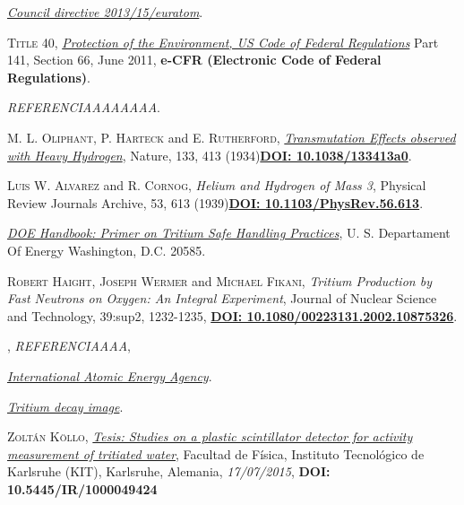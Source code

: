 \begin{thebibliography}{100}
\href{https://eur-lex.europa.eu/eli/dir/2013/59/oj}{\textit{Council directive 2013/15/euratom}}.

 \textsc{Title 40},  
\href{https://www.ecfr.gov/cgi-bin/text-idx?node=pt40.1.141}{\textit{Protection of the Environment, US Code of Federal Regulations}} Part 141, Section 66, June 2011, \textbf{e-CFR (Electronic Code of Federal Regulations)}.

\textit{REFERENCIAAAAAAAA}.

 \textsc{M. L. Oliphant}, \textsc{P. Harteck} and \textsc{E. Rutherford},  
\href{https://royalsocietypublishing.org/doi/10.1098/rspa.1934.0077}{\textit{Transmutation Effects observed with Heavy Hydrogen}}, Nature, 133, 413 (1934)\href{https://doi.org/10.1038/133413a0}{\textbf{DOI: 10.1038/133413a0}}.

 \textsc{Luis W. Alvarez} and \textsc{R. Cornog},  
\textit{Helium and Hydrogen of Mass 3}, Physical Review Journals Archive, 53, 613 (1939)\href{https://doi.org/10.1103/PhysRev.56.613}{\textbf{DOI: 10.1103/PhysRev.56.613}}.

\href{https://www.twirpx.com/file/1977676/}{\textit{DOE Handbook: Primer on Tritium Safe Handling Practices}}, U. S. Departament Of Energy Washington, D.C. 20585.

 \textsc{Robert Haight}, \textsc{Joseph Wermer} and \textsc{Michael Fikani},
\textit{Tritium Production by Fast Neutrons on Oxygen: An Integral Experiment}, Journal of Nuclear Science and Technology, 39:sup2, 1232-1235, \href{https://doi.org/10.1080/00223131.2002.10875326}{\textbf{DOI: 10.1080/00223131.2002.10875326}}. 

 \textsc{},
\textit{REFERENCIAAAA}, \textbf{}

\href{https://www-nds.iaea.org}{\textit{International Atomic Energy Agency}}.

\href{https://conexioncausal.wordpress.com}{\textit{Tritium decay image}}.

 \textsc{Zoltán Köllo},
\href{https://publikationen.bibliothek.kit.edu/1000049424}{\textit{Tesis: Studies on a plastic scintillator detector for activity measurement of tritiated water}}, Facultad de Física, Instituto Tecnológico de Karlsruhe (KIT), Karlsruhe, Alemania, \textit{17/07/2015}, \textbf{DOI: 10.5445/IR/1000049424}


\end{thebibliography}
